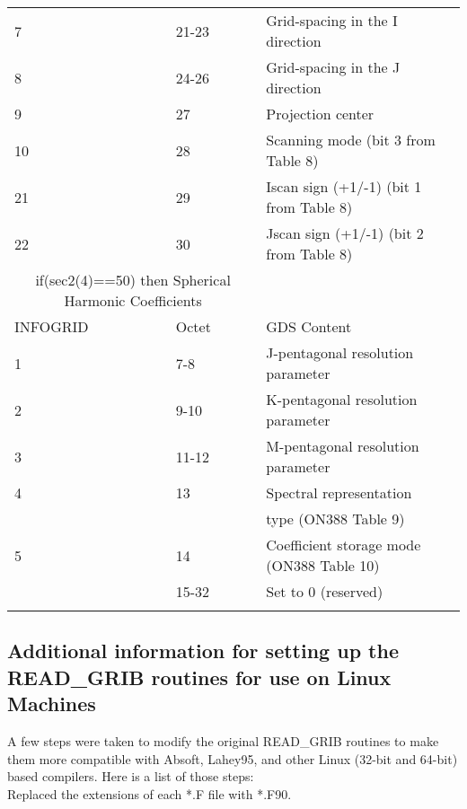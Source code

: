 \begin{longtable}{l|l|l}
       7 &        21-23 &  Grid-spacing in the I direction \\          
       8 &        24-26 &  Grid-spacing in the J direction \\                          
       9 &             27 &  Projection center      \\                                   
      10 &            28 &  Scanning mode (bit 3 from Table 8) \\                       
      21 &            29 &  Iscan sign (+1/-1) (bit 1 from Table 8) \\                  
      22 &            30 &  Jscan sign (+1/-1) (bit 2 from Table 8)\\
\hline
\multicolumn{2}{c}{if(sec2(4)==50) then Spherical Harmonic Coefficients} & \\
INFOGRID & Octet & GDS Content \\
\hline
        1&       7-8  &  J-pentagonal resolution parameter    \\
        2&     9-10  &  K-pentagonal resolution parameter  \\                       
        3&   11-12  &  M-pentagonal resolution parameter   \\                      
        4&         13  &  Spectral representation \\
         &               & type (ON388 Table 9) \\             
        5&         14  &  Coefficient storage mode (ON388 Table 10) \\                
         &             15-32 &  Set to 0 (reserved) \\
\hline
\hline
\label{table:sec2}
\end{longtable}



\subsection{Additional information for setting up the READ\_GRIB routines for use on Linux Machines}

	A few steps were taken to modify the original READ\_GRIB routines to make them more compatible with Absoft, Lahey95, and other Linux (32-bit and 64-bit) based compilers.  Here is a list of those steps:\\

Replaced the extensions of each *.F file with *.F90.\\

